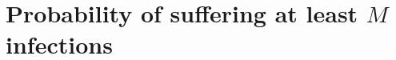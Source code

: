 \documentclass[10pt,A4paper]{article}
\begin{document}

\section{Probability of suffering at least $M$ infections}
\end{document}
